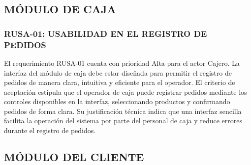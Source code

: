 \subsection{MÓDULO DE CAJA}
\subsubsection{RUSA-01: USABILIDAD EN EL REGISTRO DE PEDIDOS}
El requerimiento RUSA-01 cuenta con prioridad Alta para el actor Cajero. La interfaz del módulo de caja debe estar diseñada para permitir el registro de pedidos de manera clara, intuitiva y eficiente para el operador. El criterio de aceptación estipula que el operador de caja puede registrar pedidos mediante los controles disponibles en la interfaz, seleccionando productos y confirmando pedidos de forma clara. Su justificación técnica indica que una interfaz sencilla facilita la operación del sistema por parte del personal de caja y reduce errores durante el registro de pedidos.

\subsection{MÓDULO DEL CLIENTE}

